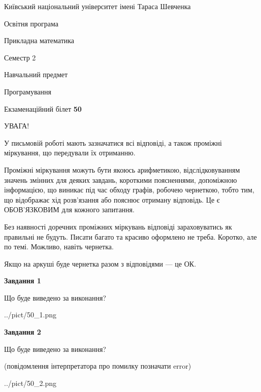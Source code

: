 \documentclass[12pt, ukrainian]{article}
\begin{document}
{{\begin {small}\par
{ \center  Київський національний університет імені Тараса Шевченка \par}
{\parbox {5 cm}{Освітня програма \hfill}{\parbox {7 cm}{Прикладна математика\hfill}}\parbox {6 cm}{\hfill Семестр 2}}\par
{\parbox {5 cm} {Навчальний предмет \hfill}\parbox {7 cm}{Програмування \hfill}\parbox {6cm}{\hfill}\par}\vspace{-7pt} \end{small}}{\center Екзаменаційний білет \No \textbf
{ 50 }\par}}
{
\begin {large}
УВАГА!

У письмовій роботі мають зазначатися всі відповіді, а також проміжні міркування, що передували їх отриманню.

Проміжні міркування можуть бути якоюсь арифметикою, відслідковуванням зна\-чень змінних для деяких завдань,
короткими поясненнями, допоміжною інформацією, що виникає під час обходу графів, робочею чернеткою,
тобто тим, що відображає хід розв’язання або пояснює отриману відповідь.
Це є ОБОВ’ЯЗКОВИМ для кожного запитання.

Без наявності доречних проміжних міркувань відповіді зараховуватись як правиль\-ні не будуть.
Писати багато та красиво оформлено не треба. Коротко, але по темі. Можли\-во, навіть чернетка.

Якщо на аркуші буде чернетка разом з відповідями --- це ОК.

\newpage

{\begin {center}\textbf{Завдання 1}\end {center}}\par
Що буде виведено за виконання?\par
\begin{center}
	{../pict/50_1.png}
\end{center}
\newpage

{\begin {center}\textbf{Завдання 2}\end {center}}\par
Що буде виведено за виконання?\par
 (повідомлення інтерпретатора про помилку позначати error)\par
\begin{center}
	{../pict/50_2.png}
\end{center}
\newpage


\end{large}}
\end{document}
